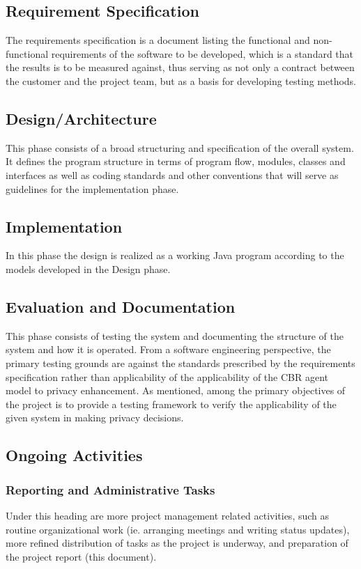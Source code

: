 \subsection{Requirement Specification}
The requirements specification is a document listing the functional and non-functional requirements of the software to be developed, which is a standard that the results is to be measured against, thus serving as not only a contract between the customer and the project team, but as a basis for developing testing methods.

\subsection{Design/Architecture}
This phase consists of a broad structuring and specification of the overall system. It defines the program structure in terms of program flow, modules, classes and interfaces as well as coding standards and other conventions that will serve as guidelines for the implementation phase.

\subsection{Implementation}
In this phase the design is realized as a working Java program according to the models developed in the Design phase. 

\subsection{Evaluation and Documentation}
This phase consists of testing the system and documenting the structure of the system and how it is operated. From a software engineering perspective, the primary testing grounds are against the standards prescribed by the requirements specification rather than applicability of the applicability of the CBR agent model to privacy enhancement. As mentioned, among the primary objectives of the project is to provide a testing framework to verify the applicability of the given system in making privacy decisions.

\subsection{Ongoing Activities}

\subsubsection{Reporting and Administrative Tasks}
Under this heading are more project management related activities, such as routine organizational work (ie. arranging meetings and writing status updates), more refined distribution of tasks as the project is underway, and preparation of the project report (this document).

